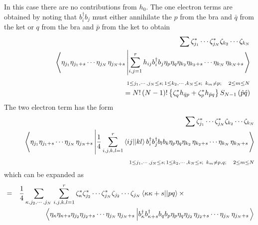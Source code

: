 \documentclass{article}
\begin{document}
In this case there are no contributions from $h_{0}$. The one electron terms
are obtained by noting that $b_{i}^{\dagger }b_{j}$ must either annihilate
the $p$ from the bra and $\bar{q}$ from the ket or $q$ from the bra and $%
\bar{p}$ from the ket to obtain 
\begin{eqnarray}
&&\sum \zeta _{j_{1}}^{\ast }\cdots \zeta _{j_{N}}^{\ast }\zeta
_{k_{2}}\cdots \zeta _{k_{N}}  \notag \\
&&\qquad \left\langle \eta _{j_{1}}\eta _{j_{1}+s}\cdots \eta _{j_{N}\,}\eta
_{j_{N}+s}\left| \sum_{i,j=1}^{r}h_{ij}b_{i}^{\dagger }b_{j}\eta _{p}\eta
_{q}\eta _{k_{2}}\eta _{k_{2}+s}\cdots \eta _{k_{N}\,}\eta _{k_{N}+s}\right.
\right\rangle  \notag \\
&&\qquad \qquad \qquad \qquad \qquad \qquad \qquad \qquad _{1\leq
j_{1},\cdots ,j_{N}\leq s;\,1\leq k_{2},\cdots ,k_{N}\leq s;\,\,\,k_{m}\neq
p;\quad 2\leq m\leq N}  \notag \\
&&\left. {}\right. \qquad \qquad \qquad \qquad \qquad \qquad =N!\left(
N-1\right) !\left\{ \zeta _{q}^{\ast }h_{\bar{q}p}+\zeta _{p}^{\ast }h_{\bar{%
p}q}\right\} S_{N-1}\left( \hat{p}\hat{q}\right)
\end{eqnarray}%
The two electron term has the form 
\begin{eqnarray}
&&\sum \zeta _{j_{1}}^{\ast }\cdots \zeta _{j_{N}}^{\ast }\zeta
_{k_{2}}\cdots \zeta _{k_{N}}  \notag \\
&&\qquad \left\langle \eta _{j_{1}}\eta _{j_{1}+s}\cdots \eta _{j_{N}\,}\eta
_{j_{N}+s}\left| \frac{1}{4}\sum_{i,j,k,l=1}^{r}\left\langle
ij||kl\right\rangle b_{i}^{\dagger }b_{j}^{\dagger }b_{l}b_{k}\eta _{p}\eta
_{q}\eta _{k_{2}\,}\eta _{k_{2}+s}\cdots \eta _{k_{N}\,}\eta
_{k_{N}+s}\right. \right\rangle  \notag \\
&&\qquad \qquad \qquad \qquad \qquad \qquad \qquad \qquad _{1\leq
j_{1},\cdots ,j_{N}\leq s;\,1\leq k_{2},\cdots ,k_{N}\leq s;\,\,\,k_{m}\neq
p,q;\quad 2\leq m\leq N}
\end{eqnarray}%
which can be expanded as 
\begin{eqnarray}
&=&\frac{1}{4}\sum_{\kappa ,j_{2},\cdots ,j_{N}\,}\sum_{i,j,k,l=1}^{r}\zeta
_{\kappa }^{\ast }\zeta _{j_{2}}^{\ast }\cdots \zeta _{j_{N}}^{\ast }\zeta
_{j_{2}}\cdots \zeta _{j_{N}}\left\langle \kappa \kappa +s||pq\right\rangle
\times \qquad \qquad \qquad \qquad \qquad  \notag \\
&&\left\langle \eta _{\kappa }\eta _{\kappa +s}\eta _{j_{2}}\eta
_{j_{2}+s}\cdots \eta _{j_{N}\,}\eta _{j_{N}+s}\left| b_{\kappa }^{\dagger
}b_{\kappa +s}^{\dagger }b_{q}b_{p}\eta _{p}\eta _{q}\eta _{j_{2}\,}\eta
_{j_{2}+s}\cdots \eta _{j_{N}\,}\eta _{j_{N}+s}\right. \right\rangle
\end{eqnarray}%
\end{document}
